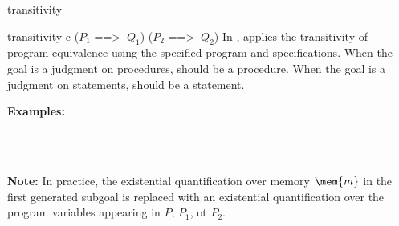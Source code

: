 \begin{tactic}{transitivity}
  \begin{tsyntax}{transitivity c ($P_1$ ==> $\ Q_1$) ($P_2$ ==> $\ Q_2$)}
  In \prhl, applies the transitivity of program equivalence using the
  specified program and specifications. When the goal is a judgment on
  procedures,  should be a procedure. When the goal is a
  judgment on statements,  should be a statement.

  \textbf{Examples:}
  \begin{mathpar}
    {}%
    \quad{} \\
    {}%
    \quad{} \\
  \end{mathpar}

  \textbf{Note:} In practice, the existential quantification over
  memory $\mem{m}$ in the first generated subgoal is replaced with an
  existential quantification over the program variables appearing in $P$,
  $P_1$, ot $P_2$.

  \end{tsyntax}
\end{tactic}

